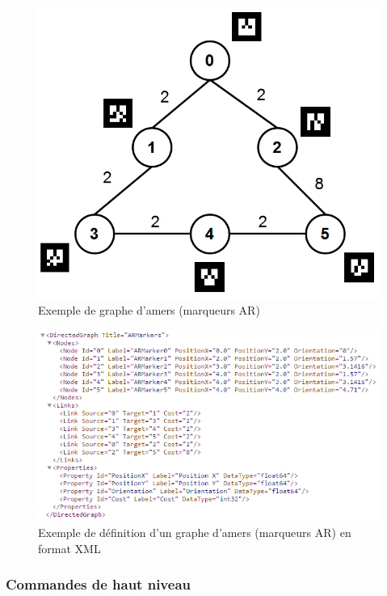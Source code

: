 \documentclass[10pt,a4paper]{article}
\begin{document}
\begin{figure}[!h]
\centering\includegraphics[scale=0.4]{figures/graphe.png}
\caption{Exemple de graphe d'amers (marqueurs AR)}
\label{graphe}
\end{figure}

\begin{figure}[!h]
\centering\includegraphics[scale=0.7]{figures/graphe_xml.png}
\caption{Exemple de définition d'un graphe d'amers (marqueurs AR) en format XML}
\label{graphe_xml}
\end{figure}

\newpage
\subsubsection{Commandes de haut niveau}
\label{sec:commandesDeHautNiveau}
\end{document}
